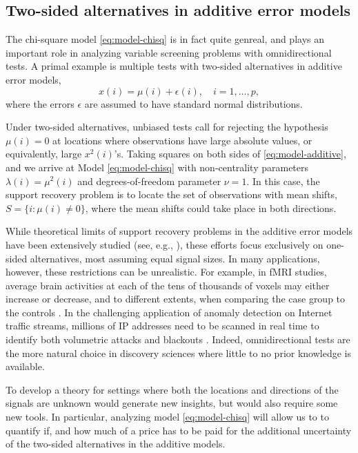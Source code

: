 \subsection{Two-sided alternatives in additive error models}
\label{subsec:motivation-additive}

The chi-square model \eqref{eq:model-chisq} is in fact quite genreal, and plays an important role in analyzing variable screening problems with omnidirectional tests.
A primal example is multiple tests with two-sided alternatives in additive error models,
\begin{equation} \label{eq:model-additive}
    x(i) = \mu(i) + \epsilon(i), \quad i=1,\ldots,p,
\end{equation}
where the errors $\epsilon$ are assumed to have standard normal distributions.

Under two-sided alternatives, unbiased tests call for rejecting the hypothesis $\mu(i)=0$ at locations where observations have large absolute values, or equivalently, large $x^2(i)$'s.
Taking squares on both sides of \eqref{eq:model-additive}, and we arrive at Model \eqref{eq:model-chisq} with non-centrality parameters $\lambda(i) = \mu^2(i)$ and degrees-of-freedom parameter $\nu =1$.
In this case, the support recovery problem is to locate the set of observations with mean shifts, $S=\{i:\mu(i)\neq 0\}$, where the mean shifts could take place in both directions.

While theoretical limits of support recovery problems in the additive error models have been extensively studied (see, e.g., \cite{arias2017distribution, butucea2018variable, gao2018fundamental}), these efforts focus exclusively on one-sided alternatives, most assuming equal signal sizes.
In many applications, however, these restrictions can be unrealistic.
For example, in fMRI studies, average brain activities at each of the tens of thousands of voxels may either increase or decrease, and to different extents, when comparing the case group to the controls \citep{narayan2015two}. 
In the challenging application of anomaly detection on Internet traffic streams, millions of IP addresses need to be scanned in real time to identify both volumetric attacks and blackouts \citep{kallitsis2016amon}.
Indeed, omnidirectional tests are the more natural choice in discovery sciences where little to no prior knowledge is available.

To develop a theory for settings where both the locations and directions of the signals are unknown would generate new insights, but would also require some new tools.
In particular, analyzing model \eqref{eq:model-chisq} will allow us to to quantify if, and how much of a price has to be paid for the additional uncertainty of the two-sided alternatives in the additive models.

